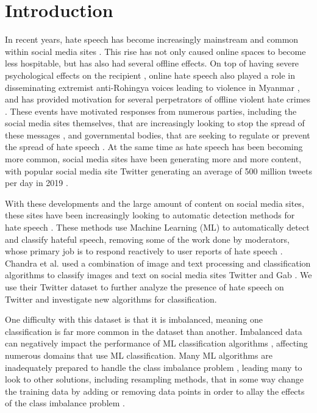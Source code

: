 \documentclass[runningheads]{llncs}
\begin{document}
\section{Introduction}
In recent years, hate speech has become increasingly mainstream and common within social media sites \cite{siegel}. This rise has not only caused online spaces to become less hospitable, but has also had several offline effects. On top of having severe psychological effects on the recipient \cite{siegel}, online hate speech also played a role in disseminating extremist anti-Rohingya voices leading to violence in Myanmar \cite{green}, and has provided motivation for several perpetrators of offline violent hate crimes \cite{siegel}. These events have motivated responses from numerous parties, including the social media sites themselves, that are increasingly looking to stop the spread of these messages \cite{ullmann}, and governmental bodies, that are seeking to regulate or prevent the spread of hate speech \cite{banks}. At the same time as hate speech has been becoming more common, social media sites have been generating more and more content, with popular social media site Twitter generating an average of 500 million tweets per day in 2019 \cite{pereira}.

With these developments and the large amount of content on social media sites, these sites have been increasingly looking to automatic detection methods for hate speech \cite{ullmann}. These methods use Machine Learning (ML) to automatically detect and classify hateful speech, removing some of the work done by moderators, whose primary job is to respond reactively to user reports of hate speech \cite{ullmann}. Chandra et al. \cite{chandra} used a combination of image and text processing and classification algorithms to classify images and text on social media sites Twitter and Gab \cite{chandra}. We use their Twitter dataset to further analyze the presence of hate speech on Twitter and investigate new algorithms for classification.

One difficulty with this dataset is that it is imbalanced, meaning one classification is far more common in the dataset than another. Imbalanced data can negatively impact the performance of ML classification algorithms \cite{sun}, affecting numerous domains that use ML classification. Many ML algorithms are inadequately prepared to handle the class imbalance problem \cite{sun}, leading many to look to other solutions, including resampling methods, that in some way change the training data by adding or removing data points in order to allay the effects of the class imbalance problem \cite{japkowicz}.
\end{document}
